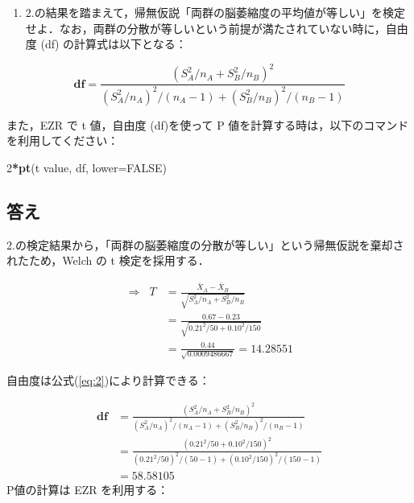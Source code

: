 \documentclass[]{problemset}
\newenvironment{Shaded}{\begin{snugshade}}{\end{snugshade}}
\newcommand{\DataTypeTok}[1]{\textcolor[rgb]{0.13,0.29,0.53}{#1}}
\newcommand{\DecValTok}[1]{\textcolor[rgb]{0.00,0.00,0.81}{#1}}
\newcommand{\KeywordTok}[1]{\textcolor[rgb]{0.13,0.29,0.53}{\textbf{#1}}}
\newcommand{\NormalTok}[1]{#1}
\newcommand{\OperatorTok}[1]{\textcolor[rgb]{0.81,0.36,0.00}{\textbf{#1}}}
\newcommand{\OtherTok}[1]{\textcolor[rgb]{0.56,0.35,0.01}{#1}}
\providecommand{\tightlist}{%
  \setlength{\itemsep}{0pt}\setlength{\parskip}{0pt}}
\begin{document}
\newpage
\vfill

\begin{enumerate}
\def\labelenumi{\arabic{enumi}.}
\setcounter{enumi}{2}
\tightlist
\item
  2.の結果を踏まえて，帰無仮説「両群の脳萎縮度の平均値が等しい」を検定せよ．なお，両群の分散が等しいという前提が満たされていない時に，自由度
  (df) の計算式は以下となる：
\end{enumerate}

\begin{equation}
\label{eq:2}
\mathbf{df} = \frac{(S^2_A/n_A + S^2_B/n_B)^2}{(S_A^2/n_A)^2/(n_A-1)+(S_B^2/n_B)^2/(n_B-1)}
\end{equation}

また，EZR で t 値，自由度 (df)を使って P
値を計算する時は，以下のコマンドを利用してください：

\begin{Shaded}
\begin{Highlighting}[]
\DecValTok{2}\OperatorTok{*}\KeywordTok{pt}\NormalTok{(t value, df, }\DataTypeTok{lower=}\OtherTok{FALSE}\NormalTok{)}
\end{Highlighting}
\end{Shaded}

\hypertarget{-2}{%
\subsection{答え}\label{-2}}

2.の検定結果から，「両群の脳萎縮度の分散が等しい」という帰無仮説を棄却されたため，Welch
の t 検定を採用する．

\[
\begin{aligned}
\Rightarrow\;\; T & = \frac{\bar{X}_A - \bar{X}_B}{\sqrt{S^2_A/n_A + S^2_B/n_B}} \\ 
                  & = \frac{0.67 - 0.23}{\sqrt{0.21^2/50 + 0.10^2/150}} \\ 
                  & = \frac{0.44}{\sqrt{0.0009486667}} = 14.28551
\end{aligned}
\]

自由度は公式(\ref{eq:2})により計算できる：

\[
\begin{aligned}
\mathbf{df} & = \frac{(S^2_A/n_A + S^2_B/n_B)^2}{(S_A^2/n_A)^2/(n_A-1)+(S_B^2/n_B)^2/(n_B-1)} \\
            & = \frac{(0.21^2/50 + 0.10^2/150)^2}{(0.21^2/50)^2/(50-1)+(0.10^2/150)^2/(150-1)} \\
            & = 58.58105
\end{aligned}
\] P値の計算は EZR を利用する：
\end{document}
